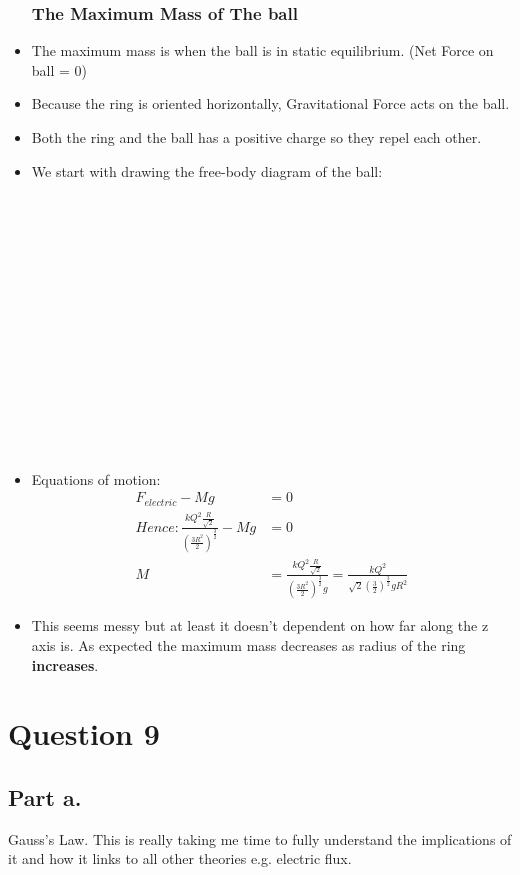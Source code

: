 \documentclass[10pt]{article}
\begin{document}
\begin{itemize}
\subsubsection{The Maximum Mass of The ball}
\item The maximum mass is when the ball is in static equilibrium. (Net Force on ball = 0)
\item Because the ring is oriented horizontally, Gravitational Force acts on the ball.
\item Both the ring and the ball has a positive charge so they repel each other.
\item We start with drawing the free-body diagram of the ball:
\\ \\ \\ \\ \\ \\ \\ \\ \\ \\ \\ \\ \\ \\ \\
\item Equations of motion: 
\begin{align*}
F_{electric}-Mg&=0 \\
Hence:
\frac{kQ^2  \frac{R}{\sqrt{2}}}{ \left( \frac{3R^2}{2} \right)^{\frac{3}{2}}} - Mg &= 0 \\
M &= \frac{kQ^2  \frac{R}{\sqrt{2}}}{ \left( \frac{3R^2}{2} \right)^{\frac{3}{2}}g} = \frac{kQ^2}{ \sqrt{2} \left(\frac{3}{2} \right)^{\frac{3}{2}}g R^2}
\end{align*}
\item This seems messy but at least it doesn't dependent on how far along the z axis is. As expected the maximum mass decreases as radius of the ring \textbf{increases}.
\end{itemize}
\pagebreak
\section{Question 9}
\subsection{Part a.}
Gauss's Law. This is really taking me time to fully understand the implications of it and how it links to all other theories e.g. electric flux.
\end{document}
